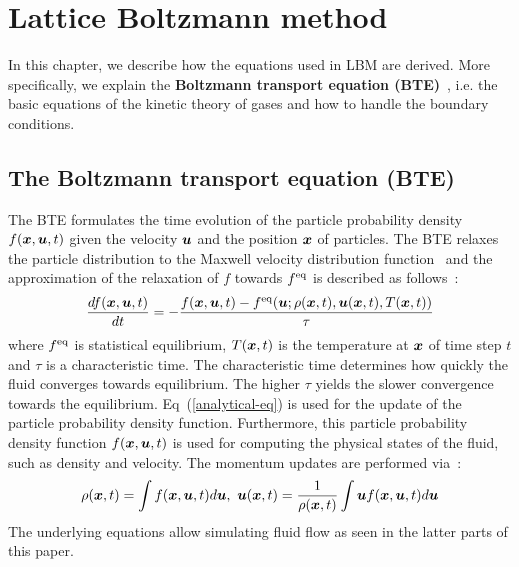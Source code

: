 \chapter{Lattice Boltzmann method}
\vspace{-8mm}
In this chapter, we describe how the equations used in LBM
are derived.
More specifically, we explain
the {\bf Boltzmann transport equation (BTE)}~\cite{mcnamara1988use}, i.e.
the basic equations of the kinetic theory of gases and
how to handle the boundary conditions.

\section{The Boltzmann transport equation (BTE)}
The BTE formulates the time evolution of the 
particle probability density $f(\boldsymbol{x}, \boldsymbol{u}, t)$ given
the velocity $\boldsymbol{u}$ and the position $\boldsymbol{x}$ of particles.
The BTE relaxes the particle distribution to
the Maxwell velocity distribution
function~\cite{huang1963statistical} and the approximation of the relaxation of
$f$ towards $f^{\rm eq}$ is described as follows~\cite{bhatnagar1954model}:
\begin{equation}
  \begin{aligned}
    \frac{d f(\boldsymbol{x}, \boldsymbol{u}, t)}{d t} &= 
    - \frac{
      f(\boldsymbol{x}, \boldsymbol{u}, t) - f^{\rm eq}(\boldsymbol{u}; \rho(\boldsymbol{x}, t), \boldsymbol{u}(\boldsymbol{x}, t), T(\boldsymbol{x}, t))
      }{\tau} \\
    \end{aligned}
    \label{analytical-eq}
  \end{equation}
where $f^{\rm eq}$ is statistical equilibrium,
$T(\boldsymbol{x}, t)$ is the temperature at $\boldsymbol{x}$
of time step $t$ and
$\tau$ is a characteristic time.
The characteristic time determines how quickly
the fluid converges towards equilibrium.
The higher $\tau$ yields the slower 
convergence towards the equilibrium.
Eq~(\ref{analytical-eq}) is used for the update 
of the particle probability density function.
Furthermore, this particle probability density function
$f(\boldsymbol{x}, \boldsymbol{u}, t)$ is used for computing
the physical states of the fluid,
such as density and velocity.
The momentum updates are performed via~\cite{caroli1984non}:
\begin{equation}
  \begin{aligned}
    \rho(\boldsymbol{x}, t) = \int f(\boldsymbol{x}, \boldsymbol{u}, t) d\boldsymbol{u},~
    \boldsymbol{u}(\boldsymbol{x}, t) = \frac{1}{\rho(\boldsymbol{x}, t)} \int \boldsymbol{u} f(\boldsymbol{x}, \boldsymbol{u}, t)  d\boldsymbol{u} 
  \end{aligned}
  \label{analytical-update}
\end{equation}
The underlying equations allow simulating
fluid flow as seen in the latter parts of this paper.

